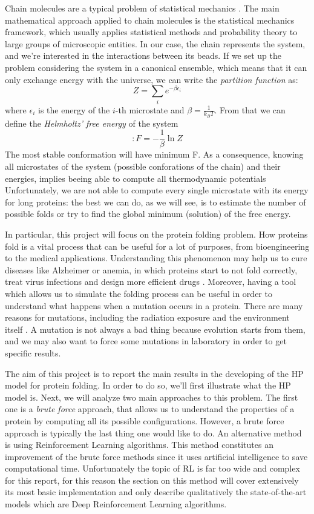 Chain molecules are a typical problem of statistical mechanics \cite{statisticalmechanics}.
The main mathematical approach applied to chain molecules is the statistical mechanics framework, which usually applies statistical methods and probability theory to large groups of microscopic entities.
In our case, the chain represents the system, and we're interested in the interactions between its beads.
If we set up the problem considering the system in a canonical ensemble, which means that it can only exchange energy with the universe, we can write the \emph{partition function} as:
\begin{equation*}
    Z = \sum_i e^{-\beta\epsilon_i}
\end{equation*}
where $\epsilon_i$ is the energy of the $i$-th microstate and $\beta = \frac{1}{k_BT}$.
From that we can define the \emph{Helmholtz' free energy} of the system
\begin{equation*}:
    F = -\frac{1}{\beta} \ln Z
\end{equation*}
The most stable conformation will have minimum F.
As a consequence, knowing all microstates of the system (possible conforations of the chain) and their energies, implies beeing able to compute all thermodynamic potentials
Unfortunately, we are not able to compute every single microstate with its energy for long proteins: the best we can do, as we will see, is to estimate the number of possible folds or try to find the global minimum (solution) of the free energy.

In particular, this project will focus on the protein folding problem.
How proteins fold is a vital process that can be useful for a lot of purposes, from bioengineering to the medical applications.
Understanding this phenomenon may help us to cure diseases like Alzheimer or anemia, in which proteins start to not fold correctly, treat virus infections and design more efficient drugs \cite{PERM}. 
Moreover, having a tool which allows us to simulate the folding process can be useful in order to understand what happens when a mutation occurs in a protein.
There are many reasons for mutations, including the radiation exposure and the environment itself \cite{zanichelli}.
A mutation is not always a bad thing because evolution starts from them, and we may also want to force some mutations in laboratory in order to get specific results.

The aim of this project is to report the main results in the developing of the HP model for protein folding.
In order to do so, we'll first illustrate what the HP model is.
Next, we will analyze two main approaches to this problem.
The first one is a \emph{brute force} approach, that allows us to understand the properties of a protein by computing all its possible configurations.
However, a brute force approach is typically the last thing one would like to do.
An alternative method is using Reinforcement Learning algorithms.
This method constitutes an improvement of the brute force methods since it uses artificial intelligence to save computational time. 
Unfortunately the topic of RL is far too wide and complex for this report, for this reason the section on this method will cover extensively its most basic implementation and only describe qualitatively the state-of-the-art models which are Deep Reinforcement Learning algorithms.
